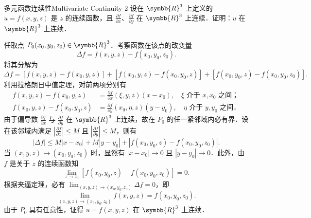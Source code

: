 \begin{problem}{多元函数连续性}{Multivariate-Continuity-2}
    设在 $\symbb{R}^3$ 上定义的 $u = f(x,y,z)$ 是 $z$ 的连续函数，且 $\frac{\partial f}{\partial x}$、$\frac{\partial f}{\partial y}$ 在 $\symbb{R}^3$ 上连续．证明：$u$ 在 $\symbb{R}^3$ 上连续．
\end{problem}

\begin{myproof}
    任取点 $P_0(x_0, y_0, z_0) \in \symbb{R}^3$．考察函数在该点的改变量
    \begin{equation}
        \Delta f = f(x, y, z) - f(x_0, y_0, z_0).
    \end{equation}
    将其分解为
    \begin{equation}
        \Delta f = [f(x, y, z) - f(x_0, y, z)] + [f(x_0, y, z) - f(x_0, y_0, z)] + [f(x_0, y_0, z) - f(x_0, y_0, z_0)].
    \end{equation}
    利用拉格朗日中值定理，对前两项分别有
    \begin{equation}
        \begin{aligned}
            f(x, y, z) - f(x_0, y, z)     & = \frac{\partial f}{\partial x}(\xi, y, z) (x - x_0), \quad \xi \text{ 介于 } x, x_0 \text{ 之间}；     \\
            f(x_0, y, z) - f(x_0, y_0, z) & = \frac{\partial f}{\partial y}(x_0, \eta, z) (y - y_0), \quad \eta \text{ 介于 } y, y_0 \text{ 之间}．
        \end{aligned}
    \end{equation}
    由于偏导数 $\frac{\partial f}{\partial x}$ 与 $\frac{\partial f}{\partial y}$ 在 $\symbb{R}^3$ 上连续，故在 $P_0$ 的任一紧邻域内必有界．设在该邻域内满足 $\left| \frac{\partial f}{\partial x} \right| \le M$ 且 $\left| \frac{\partial f}{\partial y} \right| \le M$，则有
    \begin{equation}
        |\Delta f| \le M|x - x_0| + M|y - y_0| + |f(x_0, y_0, z) - f(x_0, y_0, z_0)|.
    \end{equation}
    当 $(x, y, z) \to (x_0, y_0, z_0)$ 时，显然有 $|x - x_0| \to 0$ 且 $|y - y_0| \to 0$．此外，由 $f$ 是关于 $z$ 的连续函数知
    \begin{equation}
        \lim_{z \to z_0} [f(x_0, y_0, z) - f(x_0, y_0, z_0)] = 0.
    \end{equation}
    根据夹逼定理，必有 $\lim_{(x, y, z) \to (x_0, y_0, z_0)} \Delta f = 0$，即
    \begin{equation}
        \boxed{\lim_{(x, y, z) \to (x_0, y_0, z_0)} f(x, y, z) = f(x_0, y_0, z_0)}.
    \end{equation}
    由于 $P_0$ 具有任意性，证得 $u = f(x, y, z)$ 在 $\symbb{R}^3$ 上连续．
\end{myproof}


